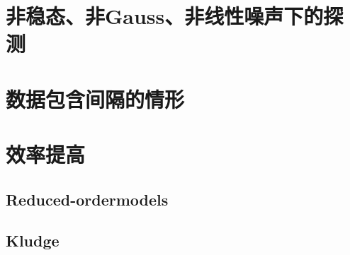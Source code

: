 \section{非稳态、非Gauss、非线性噪声下的探测}

\section{数据包含间隔的情形}

\section{效率提高}
\subsection{Reduced-ordermodels}
\subsection{Kludge}
